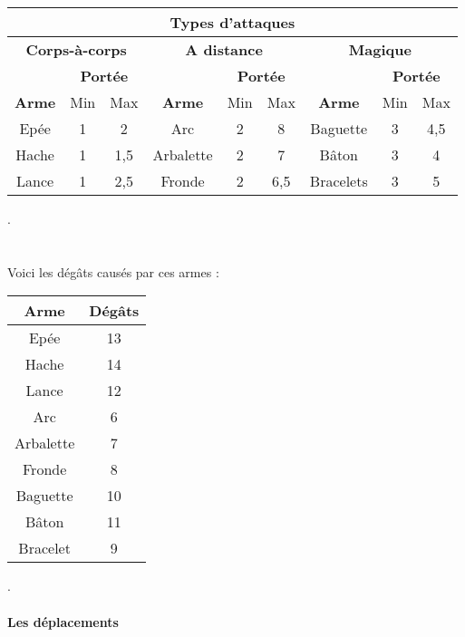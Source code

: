 \documentclass[a4paper,12pt]{report}
\begin{document}
	\begin{tabular}{|c|c|c|c|c|c|c|c|c|}
		\hline
		\multicolumn{9}{|c|}{Types d'attaques} \\
		\hline 
		\multicolumn{3}{|c|}{ \textbf{Corps-à-corps}} & 
		\multicolumn{3}{|c|}{ \textbf{A distance}}  & \multicolumn{3}{|c|}{\textbf{Magique}}\\
		\hline
		& \multicolumn{2}{|c|}{\textbf{Portée}} & & \multicolumn{2}{|c|}{\textbf{Portée}} & & \multicolumn{2}{|c|}{\textbf{Portée}} \\
		\hline
		\textbf{Arme} & Min & Max & \textbf{Arme}& Min & Max & \textbf{Arme}& Min & Max\\
		\hline 
		Epée & 1 & 2 & Arc & 2 & 8 & Baguette & 3 & 4,5 \\
		\hline
		Hache & 1 & 1,5 & Arbalette & 2 & 7 & Bâton & 3 & 4\\
		\hline
		Lance & 1 & 2,5 & Fronde & 2 & 6,5 &  Bracelets & 3 & 5 \\
		\hline

	\end{tabular}
	. \\ \\ \\
	Voici les dégâts causés par ces armes : \\ 
	\begin{center}
		\begin{tabular}{|c|c|}
			
			\hline
			Arme & Dégâts \\
			\hline
			Epée & 13 \\
			Hache & 14\\
			Lance & 12\\
			Arc & 6\\
			Arbalette & 7 \\
			Fronde & 8 \\
			Baguette & 10 \\
			Bâton & 11 \\
			Bracelet & 9 \\
			\hline
		\end{tabular}
	\end{center}
	.\\ \\
	\textbf{Les déplacements}\\
	
\end{document}

